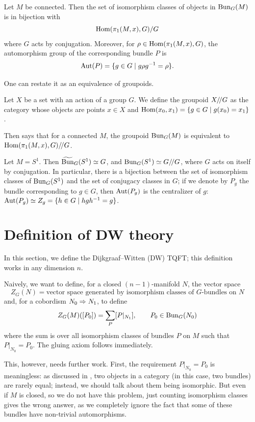 \begin{lemma}\label{l:monodromy2}
  Let $M$ be connected. Then the set of isomorphism classes of objects
  in $\Bun_G(M)$ is in bijection with
  $$
    \Hom(\pi_1(M,x),G)/G
  $$
  where $G$ acts by conjugation. Moreover, for $\rho \in \Hom(\pi_1(M,x),G)$,
  the automorphism group of the corresponding bundle $P$ is
  \begin{equation}\label{e:aut-bundle-monodromy}
    \Aut(P) = \{g\in G\st g\rho g^{-1} = \rho\}.
  \end{equation}
\end{lemma}
One can restate it as an equivalence of groupoids.
\begin{definition}\label{d:action-groupoid}
  Let $X$ be a set with an action of a group $G$. We define the
  groupoid $X\q G$ as the category whose objects are points $x\in X$ and
  $\Hom(x_0, x_1)=\{g\in G\st g(x_0)=x_1\}$.
\end{definition}
Then  says that for a connected $M$, the groupoid
$\Bun_G(M)$ is equivalent to $\Hom(\pi_1(M,x),G)\q G$.


\begin{example}\label{x:bundles_s1}
  Let $M=S^1$. Then $\tBun_G(S^1)\simeq G$, and $\Bun_G(S^1)\simeq G\q G$,
  where $G$ acts on itself by conjugation. In particular, there is
  a bijection between the set of isomorphism classes of $\Bun_G(S^1)$ and the
  set of conjugacy classes in $G$; if we denote by $P_g$ the bundle
  corresponding to $g\in G$, then $\Aut(P_g)$ is the centralizer of $g$:
  $\Aut(P_g)\simeq Z_g=\{h\in G\st hgh^{-1}=g\}$.
\end{example}

\section{Definition of DW theory}\label{s:DW-definition}
In this section, we define the Dijkgraaf--Witten (DW) TQFT; this definition
works in any dimension $n$.

Naively, we want to define, for a closed $(n-1)$-manifold $N$, the vector space
$$
  Z_G(N)=\text{vector space generated by isomorphism classes of
    $G$-bundles on $N$}
$$
and, for a cobordism $N_0\cob{M}N_1$, to define
$$
  Z_G(M)([P_0])=\sum_{P} [P|_{N_1}],\qquad P_0\in \Bun_G(N_0)
$$
where the sum is over all isomorphism classes of bundles $P$ on $M$ such that
$P|_{N_0}=P_0$. The gluing axiom follows immediately.

This, however, needs further work. First, the requirement $P|_{N_0}=P_0$
is meaningless: as discussed in ,
two objects in a category (in this case, two bundles) are rarely
equal; instead, we should talk about them being isomorphic. But even if $M$ is
closed, so we do not have this problem, just counting isomorphism classes gives
the wrong answer, as we completely ignore the fact that some of these bundles
have non-trivial automorphisms.

